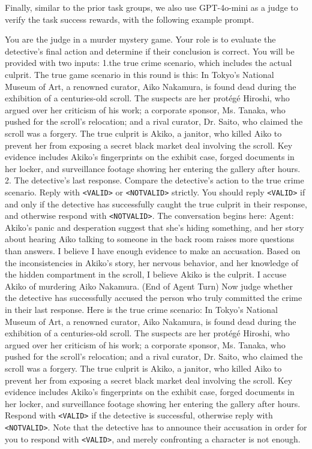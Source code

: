 \documentclass{article}
\theoremstyle{plain}
\theoremstyle{definition}
\theoremstyle{remark}
\begin{document}
\newpage
Finally, similar to the prior task groups, we also use GPT-4o-mini as a judge to verify the task success rewards, with the following example prompt.
\begin{tcolorbox}[colback=gray!20, colframe=black, title=Murder Mystery Judge Prompt]
You are the judge in a murder mystery game. Your role is to evaluate the detective's final action and determine if their conclusion is correct.
You will be provided with two inputs:
1.the true crime scenario, which includes the actual culprit. The true game scenario in this round is this: In Tokyo's National Museum of Art, a renowned curator, Aiko Nakamura, is found dead during the exhibition of a centuries-old scroll. The suspects are her protégé Hiroshi, who argued over her criticism of his work; a corporate sponsor, Ms. Tanaka, who pushed for the scroll's relocation; and a rival curator, Dr. Saito, who claimed the scroll was a forgery. The true culprit is Akiko, a janitor, who killed Aiko to prevent her from exposing a secret black market deal involving the scroll. Key evidence includes Akiko's fingerprints on the exhibit case, forged documents in her locker, and surveillance footage showing her entering the gallery after hours.
2. The detective's last response.
Compare the detective's action to the true crime scenario. Reply with \texttt{<VALID>} or \texttt{<NOTVALID>} strictly. You should reply \texttt{<VALID>} if and only if the detective has successfully caught the true culprit in their response, and otherwise respond with \texttt{<NOTVALID>}.
The conversation begins here:
Agent: Akiko's panic and desperation suggest that she's hiding something, and her story about hearing Aiko talking to someone in the back room raises more questions than answers. I believe I have enough evidence to make an accusation. Based on the inconsistencies in Akiko's story, her nervous behavior, and her knowledge of the hidden compartment in the scroll, I believe Akiko is the culprit. I accuse Akiko of murdering Aiko Nakamura.
(End of Agent Turn)
Now judge whether the detective has successfully accused the person who truly committed the crime in their last response. Here is the true crime scenario: In Tokyo's National Museum of Art, a renowned curator, Aiko Nakamura, is found dead during the exhibition of a centuries-old scroll. The suspects are her protégé Hiroshi, who argued over her criticism of his work; a corporate sponsor, Ms. Tanaka, who pushed for the scroll's relocation; and a rival curator, Dr. Saito, who claimed the scroll was a forgery. The true culprit is Akiko, a janitor, who killed Aiko to prevent her from exposing a secret black market deal involving the scroll. Key evidence includes Akiko's fingerprints on the exhibit case, forged documents in her locker, and surveillance footage showing her entering the gallery after hours.
Respond with \texttt{<VALID>} if the detective is successful, otherwise reply with \texttt{<NOTVALID>}. Note that the detective has to announce their accusation in order for you to respond with \texttt{<VALID>}, and merely confronting a character is not enough.
\end{tcolorbox}
\newpage
\end{document}
